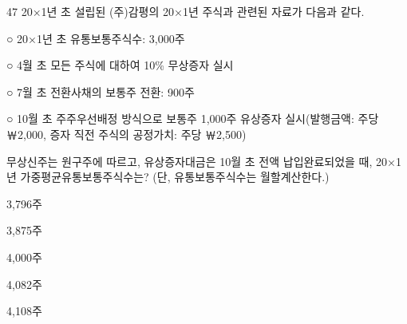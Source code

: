 \begin{question}{47}
20×1년 초 설립된 (주)감평의 20×1년 주식과 관련된 자료가 다음과 같다.
\begin{framedtext}
○ 20×1년 초 유통보통주식수: 3,000주 \par
○ 4월 초 모든 주식에 대하여 10\% 무상증자 실시 \par
○ 7월 초 전환사채의 보통주 전환: 900주 \par
○ 10월 초 주주우선배정 방식으로 보통주 1,000주 유상증자 실시(발행금액: 주당 ￦2,000, 증자 직전 주식의 공정가치: 주당 ￦2,500)
\end{framedtext}
무상신주는 원구주에 따르고, 유상증자대금은 10월 초 전액 납입완료되었을 때, 20×1년 가중평균유통보통주식수는? (단, 유통보통주식수는 월할계산한다.)
\begin{choices}
  \item 3,796주
  \item 3,875주
  \item 4,000주
  \item 4,082주
  \item 4,108주
\end{choices}
\end{question}
